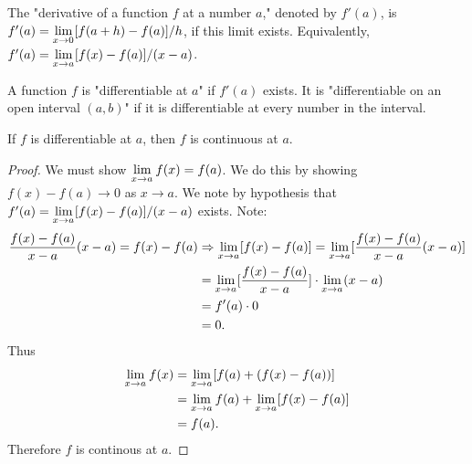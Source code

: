 \documentclass[a4paper,11pt]{article}
\begin{document}
\begin{outline}
    The "derivative of a function \(f\) at a number \(a\)," denoted by \(f'(a)\), is \(f'(a) = \lim\limits_{x\rightarrow 0^{}}
    [f(a+h)-f(a)]/h\), if this limit exists. Equivalently, \(f'(a) = \lim\limits_{x\rightarrow a^{}} [f(x)-f(a)]/(x-a)\).
    
    A function \(f\) is "differentiable at \(a\)" if \(f'(a)\) exists. It is "differentiable on an open
    interval \((a, b)\)" if it is differentiable at every number in the interval.
    
    If \(f\) is differentiable at \(a\), then \(f\) is continuous at \(a\).
    
    \begin{proof}
      We must show \(\lim\limits_{x\rightarrow a^{}} f(x) = f(a)\). We do this by showing \(f(x)-f(a)\rightarrow 0\) as 
      \(x \rightarrow a\). We note by hypothesis that \(f'(a) = \lim\limits_{x\rightarrow a^{}} [f(x)-f(a)]/(x-a)\) exists.
      Note:
      \begin{align*}
        \frac{f(x)-f(a)}{x-a}(x-a) = f(x)-f(a) 
          &\Rightarrow \lim\limits_{x\rightarrow a^{}} [f(x)-f(a)] = \lim\limits_{x\rightarrow a^{}} [\frac{f(x)-f(a)}{x-a}(x-a)]\\
          &= \lim\limits_{x\rightarrow a^{}}[\frac{f(x)-f(a)}{x-a}] \cdot \lim\limits_{x\rightarrow a^{}} (x-a)\\
          &= f'(a) \cdot 0\\
          &= 0\text{.}
      \end{align*}
      Thus 
      \begin{align*}
        \lim\limits_{x\rightarrow a^{}} f(x) &= \lim\limits_{x\rightarrow a^{}}[f(a) + (f(x)-f(a))]\\
                           &= \lim\limits_{x\rightarrow a^{}}f(a) + \lim\limits_{x\rightarrow a^{}}[f(x)-f(a)]\\
                           &= f(a)\text{.}
      \end{align*}
      Therefore \(f\) is continous at \(a\).
    \end{proof}

\end{outline}
\end{document}
